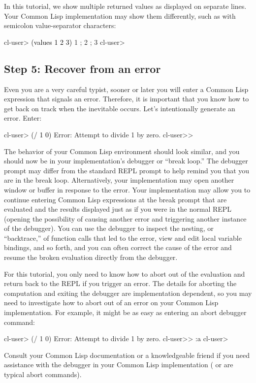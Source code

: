 \documentclass[10pt,twoside,english,pdftex]{article}
\begin{document}
In this tutorial, we show multiple returned values as displayed on separate
lines.  Your Common Lisp implementation may show them differently, such as
with semicolon value-separator characters:
%
\W\supp
\begin{example}
\textcolor{darkergray}{%
  cl-user> \textcolor{black}{(values 1 2 3)}
  1 ;
  2 ;
  3
  cl-user>}
\end{example}

\subsection*{Step 5: Recover from an error}

%
%
Even you are a very careful typist, sooner or later you will enter a Common
Lisp expression that signals an error.  Therefore, it is important that you
know how to get back on track when the inevitable occurs.  Let's intentionally
generate an error.  Enter:
%
\W\supp
\begin{example}
\textcolor{darkergray}{%
  cl-user> \textcolor{black}{(/ 1 0)}
  Error: Attempt to divide 1 by zero.
  cl-user>>}
\end{example}

The behavior of your Common Lisp environment should look similar, and you
should now be in your implementation's debugger or ``break loop.''  The
debugger prompt may differ from the standard REPL prompt to help remind you
that you are in the break loop.  Alternatively, your implementation may open
another window or buffer in response to the error.  Your implementation may
allow you to continue entering Common Lisp expressions at the break prompt
that are evaluated and the results displayed just as if you were in the normal
REPL (opening the possibility of causing another error and triggering another
instance of the debugger).  You can use the debugger to inspect the nesting,
or ``backtrace,'' of function calls that led to the error, view and edit local
variable bindings, and so forth, and you can often correct the cause of the
error and resume the broken evaluation directly from the debugger.

For this tutorial, you only need to know how to abort out of the evaluation
and return back to the REPL if you trigger an error.  The details for aborting
the computation and exiting the debugger are implementation dependent, so you
may need to investigate how to abort out of an error on your Common Lisp
implementation.  For example, it might be as easy as entering an abort
debugger command:
%
\W\supp
\begin{example}
\textcolor{darkergray}{%
  cl-user> (/ 1 0)
  Error: Attempt to divide 1 by zero.
  cl-user>> \textcolor{black}{:a}
  cl-user>}
\end{example}
%
Consult your Common Lisp documentation or a knowledgeable friend if
you need assistance with the debugger in your Common Lisp
implementation ( or  are typical abort commands).
\end{document}
